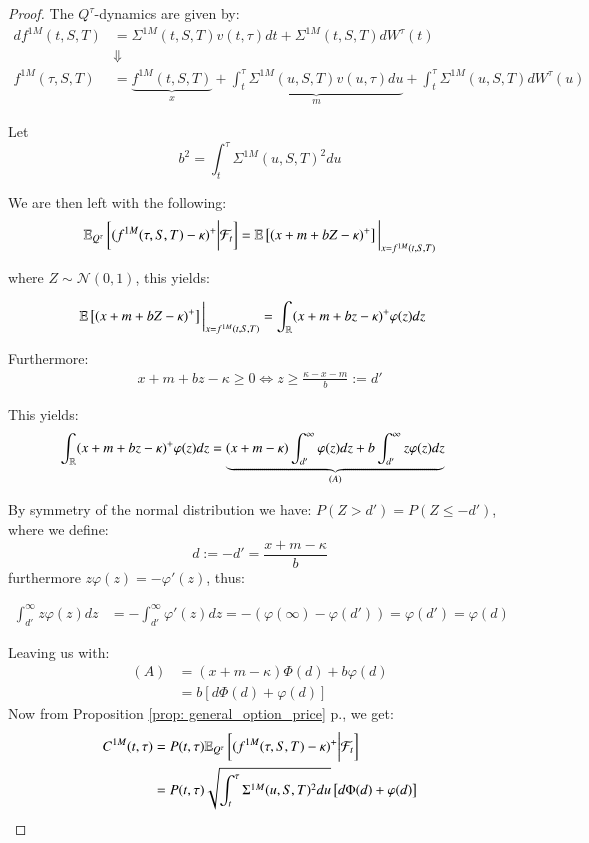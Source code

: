 \begin{proof}
The $Q^{\tau}$-dynamics are given by: 
\begin{align*}
df^{1M}(t,S,T) &= 
\Sigma^{1M}(t,S,T)v(t,\tau)dt + \Sigma^{1M}(t,S,T)dW^{\tau}(t)\\ 
&\Downarrow \\ 
f^{1M}(\tau,S,T) &= 
\underbrace{f^{1M}(t,S,T)}_{x} + 
\underbrace{\int_{t}^{\tau}\Sigma^{1M}(u,S,T)v(u,\tau)du}_{m} +  
\int_{t}^{\tau}\Sigma^{1M}(u,S,T)dW^{\tau}(u)
\end{align*}    

Let 
\[
b^{2} = \int_{t}^{\tau}\Sigma^{1M}(u,S,T)^{2}du
\]

We are then left with the following: 
\begin{align*}
\mathbb{E}_{Q^{\tau}}\left[
(f^{1M}(\tau, S,T)-\kappa)^{+}\bigg{|}\mathcal{F}_{t}
\right]    
= 
\mathbb{E}\left[
(x+m+bZ-\kappa)^{+}
\right]\bigg{|}_{x = f^{1M}(t,S,T)}
\end{align*}

where $Z \sim \mathcal{N}(0,1)$, this yields: 

\begin{align*}
\mathbb{E}\left[
(x+m+bZ-\kappa)^{+}
\right]\bigg{|}_{x = f^{1M}(t,S,T)} 
&= 
\int_{\mathbb{R}}(x+m+bz-\kappa)^{+}\varphi(z)dz 
\end{align*}

Furthermore: 
\begin{align*}
x + m + bz - \kappa \geq 0 \iff z \geq \frac{\kappa-x-m}{b}:= d'    
\end{align*}

This yields: 
\begin{align*}
\int_{\mathbb{R}}(x+m+bz-\kappa)^{+}\varphi(z)dz  
&= 
\underbrace{
(x+m-\kappa)\int_{d'}^{\infty}\varphi(z)dz
+ b\int_{d'}^{\infty}z\varphi(z)dz
}_{(A)}
\end{align*}

By symmetry of the normal distribution we have: $P(Z > d') = P(Z \leq -d')$, 
where we define: 
\[
d := -d' = \frac{x+m-\kappa}{b}
\]
furthermore $z\varphi(z) = - \varphi'(z)$, thus:

\begin{align*}
\int_{d'}^{\infty}z\varphi(z)dz
&= 
-\int_{d'}^{\infty}\varphi'(z)dz 
= 
-(\varphi(\infty) - \varphi(d'))
= \varphi(d') = \varphi(d)
\end{align*}

Leaving us with:
\begin{align*}
(A) &= (x+m-\kappa)\Phi(d) + b\varphi(d) \\ 
&= b[d\Phi(d) + \varphi(d)]
\end{align*}
Now from Proposition \ref{prop: general_option_price} p.\pageref{prop: general_option_price}, we get: 
\begin{align*}
C^{1M}(t,\tau) &= P(t,\tau)\mathbb{E}_{Q^{\tau}}\left[
(f^{1M}(\tau, S,T)-\kappa)^{+}\bigg{|}\mathcal{F}_{t}
\right] \\ 
&= 
P(t,\tau)\sqrt{
\int_{t}^{\tau}\Sigma^{1M}(u,S,T)^{2}du
}\left[
d\Phi(d) + \varphi(d)
\right]
\end{align*}
\end{proof}


